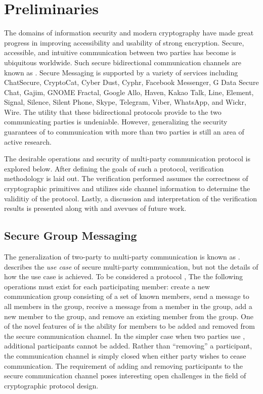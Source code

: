 \hypertarget{preliminaries}{%
\chapter{Preliminaries}\label{preliminaries}}

The domains of information security and modern cryptography have made great progress in improving accessibility and usability of strong encryption.
Secure, accessible, and intuitive communication between two parties has become is ubiquitous worldwide.
Such secure bidirectional communication channels are known as .
Secure Messaging is supported by a variety of services including ChatSecure, CryptoCat, Cyber Dust, Cyphr, Facebook Messenger, G Data Secure Chat, Gajim, GNOME Fractal, Google Allo, Haven, Kakao Talk, Line, Element, Signal, Silence, Silent Phone, Skype, Telegram, Viber, WhatsApp, and Wickr, Wire.
The utility that these bidirectional protocols provide to the two communicating parties is undeniable.
However, generalizing the security guarantees of  to communication with more than two parties is still an area of active research.

The desirable operations and security of multi-party communication protocol is explored below.
After defining the goals of such a protocol, verification methodology is laid out.
The verification performed assumes the correctness of cryptographic primitives and utilizes side channel information to determine the validitiy of the protocol.
Lastly, a discussion and interpretation of the verification results is presented along with and avevues of future work.


\hypertarget{secure-group-messaging}{%
\section{Secure Group Messaging}\label{secure-group-messaging}}

The generalization of two-party  to multi-party communication is known as .
 describes the \emph{use case} of secure multi-party communication, but not the details of how the use case is achieved.
To be considered a  protocol \autocite{ietf-mls-protocol-14}, The  the following operations must exist for each participating member: create a new communication group consisting of a set of known members, send a message to all members in the group, receive a message from a member in the group, add a new member to the group, and remove an existing member from the group.
One of the novel features of  is the ability for members to be added and removed from the secure communication channel.
In the simpler case when two parties use , additional participants cannot be added.
Rather than ``removing'' a participant, the communication channel is simply closed when either party wishes to cease communication.
The  requirement of adding and removing participants to the secure communication channel poses interesting open challenges in the field of cryptographic protocol design.


